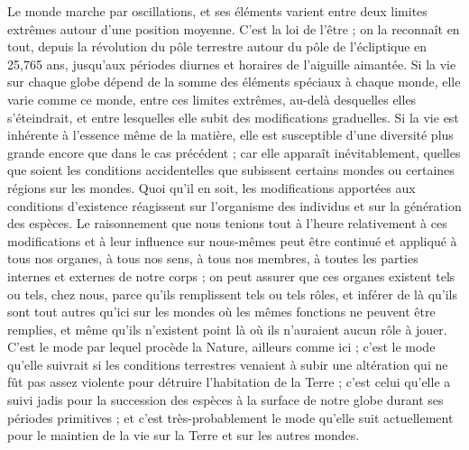 \documentclass[a4paper, 11pt, oneside]{article}
\begin{document}
Le monde marche par oscillations, et ses éléments varient entre deux limites extrêmes autour d'une position moyenne. C'est la loi de l'être ; on la reconnaît en tout, depuis la révolution du pôle terrestre autour du pôle de l'écliptique en 25,765 ans, jusqu'aux périodes diurnes et horaires de l'aiguille aimantée. Si la vie sur chaque globe dépend de la somme des éléments spéciaux à chaque monde, elle varie comme ce monde, entre ces limites extrêmes, au-delà desquelles elles s'éteindrait, et entre lesquelles elle subit des modifications graduelles. Si la vie est inhérente à l'essence même de la matière, elle est susceptible d'une diversité plus grande encore que dans le cas précédent ; car elle apparaît inévitablement, quelles que soient les conditions accidentelles que subissent certains mondes ou certaines régions sur les mondes. Quoi qu'il en soit, les modifications apportées aux conditions d'existence réagissent sur l'organisme des individus et sur la génération des espèces. Le raisonnement que nous tenions tout à l'heure relativement à ces modifications et à leur influence sur nous-mêmes peut être continué et appliqué à tous nos organes, à tous nos sens, à tous nos membres, à toutes les parties internes et externes de notre corps ; on peut assurer que ces organes existent tels ou tels, chez nous, parce qu'ils remplissent tels ou tels rôles, et inférer de là qu'ils sont tout autres qu'ici sur les mondes où les mêmes fonctions ne peuvent être remplies, et même qu'ils n'existent point là où ils n'auraient aucun rôle à jouer. C'est le mode par lequel procède la Nature, ailleurs comme ici ; c'est le mode qu'elle suivrait si les conditions terrestres venaient à subir une altération qui ne fût pas assez violente pour détruire l'habitation de la Terre ; c'est celui qu'elle a suivi jadis pour la succession des espèces à la surface de notre globe durant ses périodes primitives ; et c'est très-probablement le mode qu'elle suit actuellement pour le maintien de la vie sur la Terre et sur les autres mondes.
\end{document}
